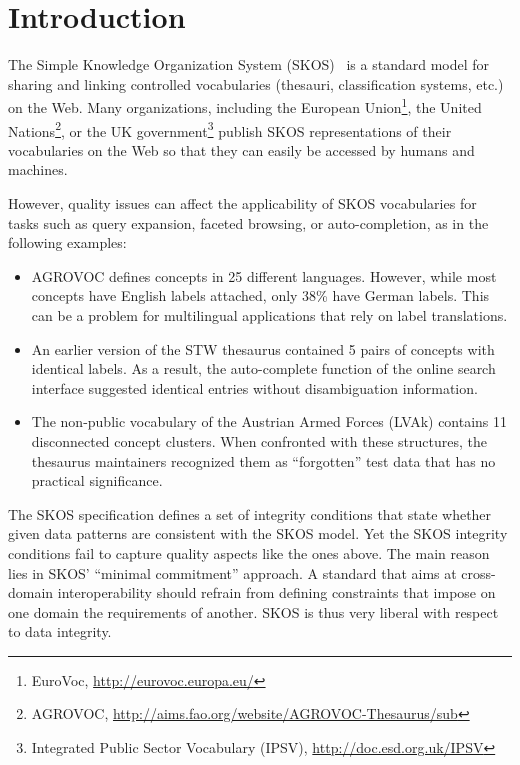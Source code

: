 
\section{Introduction}\label{sec:introduction}


The Simple Knowledge Organization System (SKOS)~\cite{SkosReference2008} is a standard model for sharing and linking controlled vocabularies (thesauri, classification systems, etc.) on the Web. Many organizations, including the European Union\footnote{EuroVoc, \url{http://eurovoc.europa.eu/}}, the United Nations\footnote{AGROVOC, \url{http://aims.fao.org/website/AGROVOC-Thesaurus/sub}}, or the UK government\footnote{Integrated Public Sector Vocabulary (IPSV), \url{http://doc.esd.org.uk/IPSV}} publish SKOS representations of their vocabularies on the Web so that they can easily be accessed by humans and machines.

However, quality issues can affect the applicability of SKOS vocabularies for tasks such as query expansion, faceted browsing, or auto-completion, as in the following examples: 

\begin{itemize}

	\item AGROVOC defines concepts in 25 different languages. However, while most concepts have English labels attached, only 38\% have German labels. This can be a problem for multilingual applications that rely on label translations.

	\item An earlier version of the STW thesaurus contained 5 pairs of concepts with identical labels. As a result, the auto-complete function of the online search interface suggested identical entries without disambiguation information.

	\item The non-public vocabulary of the Austrian Armed Forces (LVAk) contains 11 disconnected concept clusters. When confronted with these structures, the thesaurus maintainers recognized them as ``forgotten'' test data that has no practical significance.
	
\end{itemize}


The SKOS specification defines a set of integrity conditions that state whether given data patterns are consistent with the SKOS model. Yet the SKOS integrity conditions fail to capture quality aspects like the ones above. The main reason lies in SKOS' ``minimal commitment'' approach. A standard that aims at cross-domain interoperability should refrain from defining constraints that impose on one domain the requirements of another. SKOS is thus very liberal with respect to data integrity.

